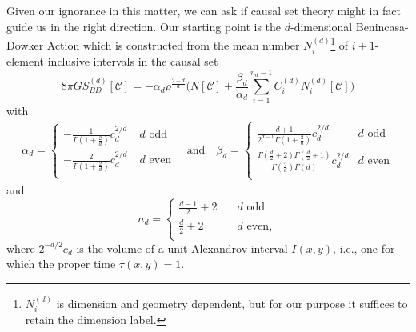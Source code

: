\documentclass[12pt]{article}
\begin{document}
Given our ignorance in this matter,  we can ask if causal set theory  might  in fact guide us in the right direction.   Our starting point is the $d$-dimensional  Benincasa-Dowker Action \cite{Benincasa_Dowker:The_Scalar_Curvature_of_a_Causal_Set, Dowker_Glaser:dAlembertians_for_Causal_Sets} which is constructed from the mean number  $N_i^{ (d)}$\footnote{ $N_i^{ (d)}$ is dimension  and geometry dependent, but for our purpose it suffices to retain the dimension label. } of $i+1$-element inclusive intervals in the causal set 
\begin{equation}   
8 \pi G {S_{BD}^{ (d)}}\left[\mathcal C\right] = -\alpha_d \rho^{\frac{2-d}{d}}\biggl ( N[\mathcal C]+ \frac{\beta_d}{ \alpha_d} \sum_{i=1}^{n_d-1}  C^{ (d)}_{i} N _i^{ (d)}[\mathcal C] \biggr) 
\label{bd} 
\end{equation}  
with   
\begin{equation}
\begin{aligned}
 \alpha_d =   
\begin{cases}
\displaystyle
-\frac1{\Gamma\left (1+\frac2d\right)}c_d ^{2/d} \;   &d \, \, \mathrm{odd} \\
\displaystyle
- \frac{2}{\Gamma\left (1+\frac2d\right)}c_d ^{2/d}  \;   &d \, \,  \mathrm{even} \\
\end{cases}
\quad\text{and}\quad 
\beta_d =
\begin{cases}\displaystyle
\frac{d+1}{2^{d-1}\Gamma\left (1+\frac2d\right)} c_d^{2/d}   \;   &d\mathrm{ \, \, odd}\\ 
\displaystyle
\frac{\Gamma\left (\frac{d}{2}+2\right)\Gamma\left (\frac{d}{2}+1\right)}{\Gamma\left (\frac{2}{d}\right)\Gamma\left (d\right)}c_d^{2/d}  &  d\mathrm{ \, \,  even}\\ 
\end{cases} 
\end{aligned}
\end{equation}
and
\begin{equation} 
n_d = 
\begin{cases} 
\frac{d-1}{2} + 2  \quad & d\mathrm{ \, \, odd}\\ 
\frac{d}{2} + 2  \quad &d\mathrm{ \, \,  even,}\\ 
\end{cases} 
\end{equation} 
where  $2^{-d/2} c_d$ is the volume of a unit Alexandrov interval $I (x,y)$, i.e., one for which the proper time $\tau (x,y)=1$. 
\end{document}
